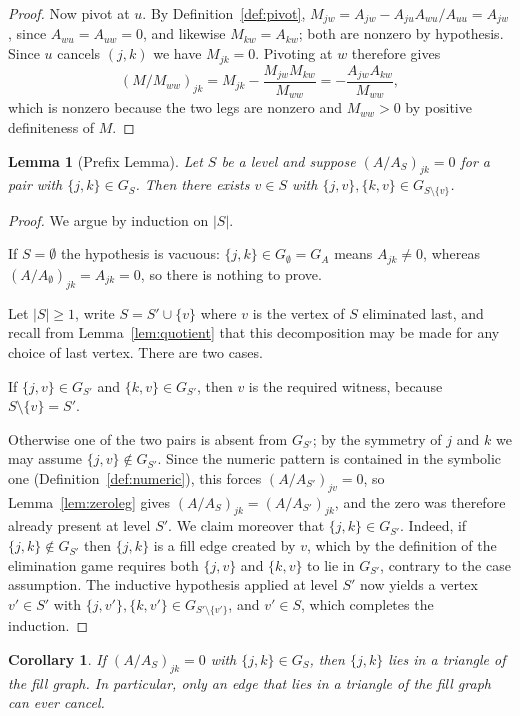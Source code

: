 \documentclass[11pt]{article}
\theoremstyle{plain}
\newtheorem{lemma}[theorem]{Lemma}
\newtheorem{corollary}[theorem]{Corollary}
\theoremstyle{definition}
\theoremstyle{remark}
\begin{document}
\begin{humanaiblock}
\begin{proof}
Now pivot at $u$. By Definition~\ref{def:pivot},
$M_{jw}=A_{jw}-A_{ju}A_{wu}/A_{uu}=A_{jw}$, since $A_{wu}=A_{uw}=0$, and likewise $M_{kw}=A_{kw}$;
both are nonzero by hypothesis. Since $u$ cancels $(j,k)$ we have $M_{jk}=0$. Pivoting at $w$
therefore gives
\[
  (M/M_{ww})_{jk}=M_{jk}-\frac{M_{jw}M_{kw}}{M_{ww}}=-\frac{A_{jw}A_{kw}}{M_{ww}},
\]
which is nonzero because the two legs are nonzero and $M_{ww}>0$ by positive definiteness of $M$.
\end{proof}

\begin{lemma}[Prefix Lemma]\label{lem:prefix}
Let $S$ be a level and suppose $(A/A_S)_{jk}=0$ for a pair with $\{j,k\}\in G_S$. Then there exists
$v\in S$ with $\{j,v\},\{k,v\}\in G_{S\setminus\{v\}}$.
\end{lemma}

\begin{proof}
We argue by induction on $|S|$.

If $S=\emptyset$ the hypothesis is vacuous: $\{j,k\}\in G_\emptyset=G_A$ means $A_{jk}\neq0$, whereas
$(A/A_\emptyset)_{jk}=A_{jk}=0$, so there is nothing to prove.

Let $|S|\ge1$, write $S=S'\cup\{v\}$ where $v$ is the vertex of $S$ eliminated last, and recall from
Lemma~\ref{lem:quotient} that this decomposition may be made for any choice of last vertex. There are
two cases.

If $\{j,v\}\in G_{S'}$ and $\{k,v\}\in G_{S'}$, then $v$ is the required witness, because
$S\setminus\{v\}=S'$.

Otherwise one of the two pairs is absent from $G_{S'}$; by the symmetry of $j$ and $k$ we may assume
$\{j,v\}\notin G_{S'}$. Since the numeric pattern is contained in the symbolic one
(Definition~\ref{def:numeric}), this forces $(A/A_{S'})_{jv}=0$, so Lemma~\ref{lem:zeroleg} gives
$(A/A_S)_{jk}=(A/A_{S'})_{jk}$, and the zero was therefore already present at level $S'$. We claim
moreover that $\{j,k\}\in G_{S'}$. Indeed, if $\{j,k\}\notin G_{S'}$ then $\{j,k\}$ is a fill edge
created by $v$, which by the definition of the elimination game requires both $\{j,v\}$ and $\{k,v\}$
to lie in $G_{S'}$, contrary to the case assumption. The inductive hypothesis applied at level $S'$
now yields a vertex $v'\in S'$ with $\{j,v'\},\{k,v'\}\in G_{S'\setminus\{v'\}}$, and $v'\in S$, which
completes the induction.
\end{proof}

\begin{corollary}\label{cor:tri-nec}
If $(A/A_S)_{jk}=0$ with $\{j,k\}\in G_S$, then $\{j,k\}$ lies in a triangle of the fill graph. In
particular, only an edge that lies in a triangle of the fill graph can ever cancel.
\end{corollary}


\end{humanaiblock}
\end{document}

